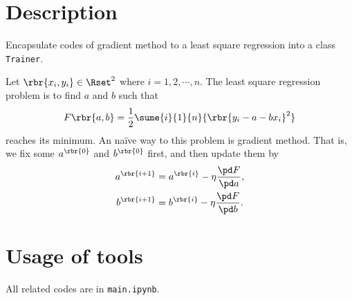 \documentclass[english, nochinese]{../../TeXTemplate/pkupaper}
\title{\titlemark}
\author{pppppass}
\date{January 30 2018}
\begin{document}
\maketitle

\section{Description}

Encapsulate codes of gradient method to a least square regression into a class \verb"Trainer".

Let $ \rbr{ x_i, y_i } \in \Rset^2 $ where $ i = 1, 2, \cdots, n $. The least square regression problem is to find $a$ and $b$ such that
\begin{equation}
F \rbr{ a, b } = \frac{1}{2} \sume{i}{1}{n}{\rbr{ y_i - a - b x_i }^2}
\end{equation}
reaches its minimum. An na\"ive way to this problem is gradient method. That is, we fix some $a^{\rbr{0}}$ and $b^{\rbr{0}}$ first, and then update them by
\begin{gather}
a^{\rbr{ i + 1 }} = a^{\rbr{i}} - \eta \frac{ \pd F }{ \pd a }, \\
b^{\rbr{ i + 1 }} = b^{\rbr{i}} - \eta \frac{ \pd F }{ \pd b }.
\end{gather}

\section{Usage of tools}

All related codes are in \verb"main.ipynb".
\end{document}

